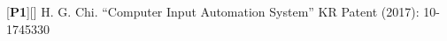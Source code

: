 


\begin{cventries}

\cvtext
{ %
\begin{cvitems}
\item {[\textbf{P1}][\href{https://docs.google.com/viewer?url=https://github.com/stnoah1/CV/raw/master/documents/patent.pdf}{}] H. G. Chi.  “Computer Input Automation System” KR Patent (2017): 10-1745330}
\end{cvitems}
}


\end{cventries}